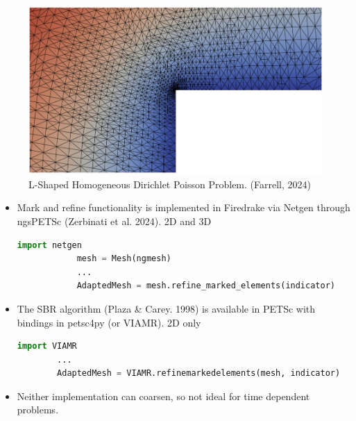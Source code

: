 \documentclass{beamer}
\begin{document}
  \begin{frame}
	\begin{figure}
		\includegraphics[width=\textwidth]{Figures/PoissonLshaped.png}
		\caption{L-Shaped Homogeneous Dirichlet Poisson Problem. (Farrell, 2024)}
	\end{figure}
	
  \end{frame}

  \begin{frame}[fragile]
	\begin{itemize}
		\item Mark and refine functionality is implemented in Firedrake via Netgen through ngsPETSc (Zerbinati et al. 2024). 2D and 3D
		\begin{lstlisting}[language=Python, basicstyle=\ttfamily\scriptsize]
			import netgen
			mesh = Mesh(ngmesh)
			...
			AdaptedMesh = mesh.refine_marked_elements(indicator)
		\end{lstlisting}
	\end{itemize}	
	\vfill
	\begin{itemize}
	\item The SBR algorithm (Plaza \& Carey. 1998) is available in PETSc with bindings in petsc4py (or VIAMR). 2D only
	\begin{lstlisting}[language=Python, basicstyle=\ttfamily\scriptsize]
		import VIAMR
		...
		AdaptedMesh = VIAMR.refinemarkedelements(mesh, indicator)
	\end{lstlisting}
	\vfill
	\item Neither implementation can coarsen, so not ideal for time dependent problems. 
	\end{itemize}
  \end{frame}
\end{document}
